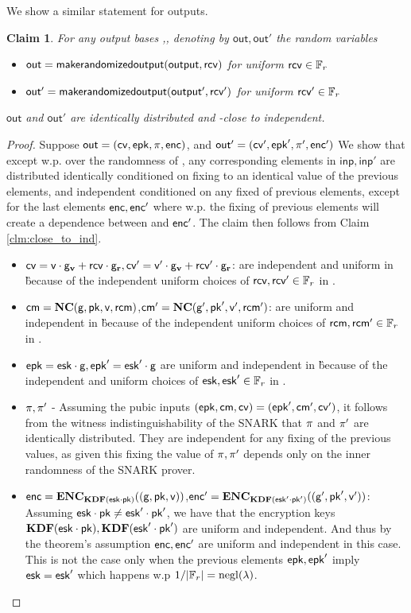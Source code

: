 \documentclass[11pt]{article}
\numberwithin{equation}{section} %
\numberwithin{figure}{section} %
\newtheorem{claim}[thm]{Claim}
\newcommand{\inp}{\ensuremath{\mathsf{inp}}\xspace}
\newcommand{\out}{\ensuremath{\mathsf{out}}\xspace}
\begin{document}
 We show a similar statement for outputs. 
\begin{claim}\label{clm:outs-areind}
For any output bases \output,\primeof{\output}, denoting by $\out,\out'$ the random variables 
\begin{itemize}
 \item 
$\out = \makerandomizedoutput(\output,\rcv)$ for uniform $\mathsf{rcv} \in {\mathbb F}_r$
\item
$\out' = \makerandomizedoutput(\output',\rcv')$ for uniform $\mathsf{rcv}' \in {\mathbb F}_r$
\end{itemize}
\out and $\out'$ are identically distributed and \negl-close to independent.

\end{claim}
\begin{proof}
Suppose $\out=(\cv,\epk,\prf,\noteenc)$, and $\out'=(\cv',\epk',\prf',\noteenc')$ 
We show that except w.p. \negl over the randomness of \adv, any corresponding elements in $\inp,\inp'$ are distributed identically conditioned on fixing to an identical value of the previous elements, and independent conditioned on any fixed of previous elements, except for the last elements $\mathsf{enc},\mathsf{enc}'$ where w.p. \negl the fixing of previous elements will create a dependence between \noteenc and $\mathsf{enc}'$.
The claim then follows from Claim \ref{clm:close_to_ind}.
 \begin{itemize}
  \item $\mathsf{cv}=\mathsf{v}\cdot \mathsf{g}_{\mathbf{v}} + \mathsf{rcv}\cdot \mathsf{g}_\mathbf{r},\mathsf{cv}'=\mathsf{v}'\cdot \mathsf{g}_{\mathbf{v}} + \mathsf{rcv}'\cdot \mathsf{g}_\mathbf{r}$: are independent and uniform in \G because of the independent uniform choices of $\mathsf{rcv},\mathsf{rcv}'\in {\mathbb F}_r$ in \makerandomizedtx.
  \item $\mathsf{cm} = \mathbf{NC}(\mathsf{g},\mathsf{pk},\mathsf{v},\mathsf{rcm})$,$\mathsf{cm}' = \mathbf{NC}(\mathsf{g}',\mathsf{pk}',\mathsf{v}',\mathsf{rcm}')$: are uniform and independent in \G because of the independent uniform choices of $\mathsf{rcm},\mathsf{rcm}'\in {\mathbb F}_r$ in \makerandomizedoutput.
  \item $\mathsf{epk}=\mathsf{esk}\cdot \mathsf{g},\mathsf{epk}'=\mathsf{esk}'\cdot \mathsf{g}$ are uniform and independent in \G because of the independent and uniform choices of $\mathsf{esk},\mathsf{esk}'\in {\mathbb F}_r$ in \makerandomizedoutput.
  \item $\pi,\pi'$ - Assuming the pubic inputs $(\mathsf{epk},\mathsf{cm},\mathsf{cv})=(\mathsf{epk}',\mathsf{cm}',\mathsf{cv}')$, it follows from the witness indistinguishability of the SNARK
  that $\pi$ and $\pi'$ are identically distributed. They are independent for any fixing of the previous values, as given this fixing the value
  of $\pi,\pi'$ depends only on the inner randomness of the SNARK prover.
  \item $\mathsf{enc} = \mathbf{ENC}_{\mathbf{KDF}(\mathsf{esk}\cdot\mathsf{pk})}((\mathsf{g},\mathsf{pk},\mathsf{v}))$,$\mathsf{enc}' = \mathbf{ENC}_{\mathbf{KDF}(\mathsf{esk}'\cdot\mathsf{pk}')}((\mathsf{g}',\mathsf{pk}',\mathsf{v}'))$:
 Assuming $\mathsf{esk}\cdot \mathsf{pk}\neq \mathsf{esk}'\cdot \mathsf{pk}'$, we have that the encryption keys $\mathbf{KDF}(\mathsf{esk}\cdot\mathsf{pk}),\mathbf{KDF}(\mathsf{esk}'\cdot\mathsf{pk}')$ are uniform and independent.
 And thus by the theorem's assumption $\mathsf{enc},\mathsf{enc}'$ are uniform and independent in this case. This is not the case only when the previous elements
 $\mathsf{epk},\mathsf{epk}'$ imply $\mathsf{esk}=\mathsf{esk}'$ which happens w.p $1/|{\mathbb F}_r| = \mathrm{negl}(\lambda)$.
  \end{itemize}
\end{proof}
\end{document}
